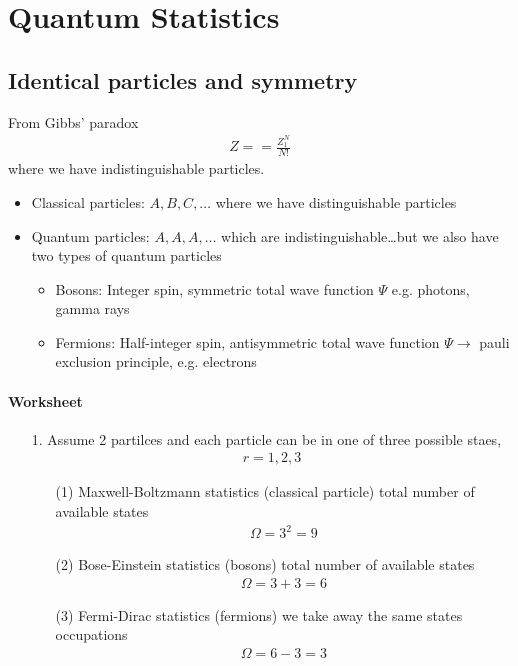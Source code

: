 \documentclass[../main.tex]{subfiles}
\begin{document}
\pagestyle{fancy}


\section{Quantum Statistics}

\subsection{Identical particles and symmetry}
From Gibbs' paradox
\begin{align*}
    Z = = \frac{Z_1^N}{N!}
\end{align*}
where we have indistinguishable particles.

\begin{itemize}
    \item Classical particles: $A, B, C, \dots$ where we have distinguishable particles
    \item Quantum particles: $A, A, A, \dots$ which are indistinguishable\dots but we also have two types of quantum particles
    \begin{itemize}
        \item Bosons: Integer spin, symmetric total wave function $\Psi$
        e.g. photons, gamma rays
        \item Fermions: Half-integer spin, antisymmetric total wave function $\Psi \to$ pauli exclusion principle, 
        e.g. electrons
    \end{itemize}
\end{itemize}

\paragraph{Worksheet}
\begin{itemize}
    \item [1.] Assume 2 partilces and each particle can be in one of three possible staes,
    \begin{align*}
        r = 1, 2, 3
    \end{align*}
    \begin{itemize}
        \item [(1)] Maxwell-Boltzmann statistics (classical particle) total number of available states
        \begin{align*}
            \Omega = 3^2 = 9
        \end{align*}
        \item [(2)] Bose-Einstein statistics (bosons) total number of available states
        \begin{align*}
            \Omega = 3 + 3 = 6 
        \end{align*}
        \item [(3)] Fermi-Dirac statistics (fermions) we take away the same states occupations
        \begin{align*}
            \Omega = 6 - 3 = 3
        \end{align*}
    \end{itemize}
\end{itemize}
\end{document}
